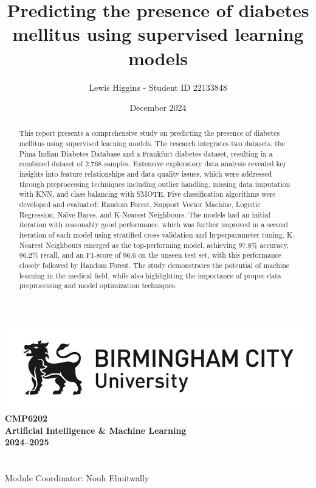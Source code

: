\documentclass[12pt]{report}
\title{Predicting the presence of diabetes mellitus using supervised learning models}
\author{Lewis Higgins - Student ID 22133848}
\date{December 2024}
\begin{document}
\makeatletter
\begin{titlepage}
    \begin{center}
        \includegraphics[width=.8\linewidth]{BCU-Long.jpg}\\[4ex]
        {\huge \bfseries CMP6202}\\[4ex]
        {\huge \bfseries Artificial Intelligence \& Machine Learning}\\[4ex]
        {\huge \bfseries 2024–2025}\\[16ex]
        {\huge \bfseries  \@title}\\[40ex]
        {\@author}\\[2ex]
        {Module Coordinator: Nouh Elmitwally}\\[10ex]
    \end{center}
\end{titlepage}
\makeatother
\thispagestyle{empty}
\newpage


\setcounter{page}{0}


\tableofcontents
\thispagestyle{empty}

\begin{abstract}
    This report presents a comprehensive study on predicting the presence of diabetes mellitus using supervised learning models. 
    The research integrates two datasets, the Pima Indian Diabetes Database and a Frankfurt diabetes dataset, resulting in a combined dataset of
    2,768 samples. Extensive exploratory data analysis revealed key insights into feature relationships and data quality issues, which were 
    addressed through preprocessing techniques including outlier handling, missing data imputation with KNN, and class balancing with SMOTE. 
    Five classification algorithms were developed and evaluated: Random Forest, Support Vector Machine, Logistic Regression, Naïve Bayes, and K-Nearest Neighbours.
    The models had an initial iteration with reasonably good performance, which was further improved in a second iteration of each model using stratified cross-validation
    and hyperparameter tuning. K-Nearest Neighbours emerged as the top-performing model, achieving 97.8\% accuracy, 96.2\% recall, and an F1-score of 96.6 on the unseen test set,
    with this performance closely followed by Random Forest. The study demonstrates the potential of machine learning in the medical field, while also highlighting the 
    importance of proper data preprocessing and model optimization techniques. 
\end{abstract}
\end{document}
